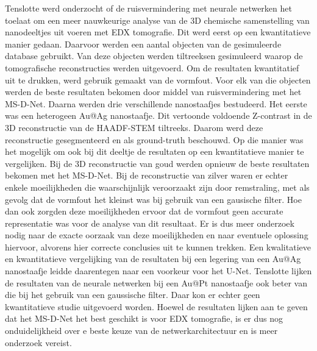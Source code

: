 \documentclass{report}
\begin{document}
Tenslotte werd onderzocht of de ruisvermindering met neurale netwerken het toelaat om een meer nauwkeurige analyse van de 3D chemische samenstelling van nanodeeltjes uit voeren met EDX tomografie. Dit werd eerst op een kwantitatieve manier gedaan. Daarvoor werden een aantal objecten van de gesimuleerde database gebruikt. Van deze objecten werden tiltreeksen gesimuleerd waarop de tomografische reconstructies werden uitgevoerd. Om de resultaten kwantitatief uit te drukken, werd gebruik gemaakt van de vormfout. Voor elk van die objecten werden de beste resultaten bekomen door middel van ruisvermindering met het MS-D-Net. Daarna werden drie verschillende nanostaafjes bestudeerd. Het eerste was een heterogeen Au@Ag nanostaafje. Dit vertoonde voldoende Z-contrast in de 3D reconstructie van de HAADF-STEM tiltreeks. Daarom werd deze reconstructie gesegmenteerd en als ground-truth beschouwd. Op die manier was het mogelijk om ook bij dit deeltje de resultaten op een kwantitatieve manier te vergelijken. Bij de 3D reconstructie van goud werden opnieuw de beste resultaten bekomen met het MS-D-Net. Bij de reconstructie van zilver waren er echter enkele moeilijkheden die waarschijnlijk veroorzaakt zijn door remstraling, met als gevolg dat de vormfout het kleinst was bij gebruik van een gausische filter. Hoe dan ook zorgden deze moeilijkheden ervoor dat de vormfout geen accurate representatie was voor de analyse van dit resultaat. Er is dus meer onderzoek nodig naar de exacte oorzaak van deze moeilijkheden en naar eventuele oplossing hiervoor, alvorens hier correcte conclusies uit te kunnen trekken. Een kwalitatieve en kwantitatieve vergelijking van de resultaten bij een legering van een Au@Ag nanostaafje leidde daarentegen naar een voorkeur voor het U-Net. Tenslotte lijken de resultaten van de neurale netwerken bij een Au@Pt nanostaafje ook beter van die bij het gebruik van een gaussische filter. Daar kon er echter geen kwantitatieve studie uitgevoerd worden. Hoewel de resultaten lijken aan te geven dat het MS-D-Net het best geschikt is voor EDX tomografie, is er dus nog onduidelijkheid over e beste keuze van de netwerkarchitectuur en is meer onderzoek vereist.
\end{document}
